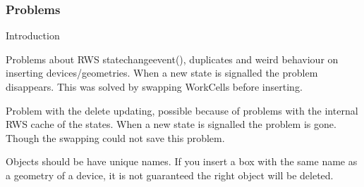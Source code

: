 \subsubsection{Problems}
\label{sec:eiProblems}
Introduction

Problems about RWS statechangeevent(), duplicates and weird behaviour on inserting devices/geometries. When a new state is signalled the problem disappears. This was solved by swapping WorkCells before inserting.

Problem with the delete updating, possible because of problems with the internal RWS cache of the states. When a new state is signalled the problem is gone. Though the swapping could not save this problem.

Objects should be have unique names. If you insert a box with the same name as a geometry of a device, it is not guaranteed the right object will be deleted.


